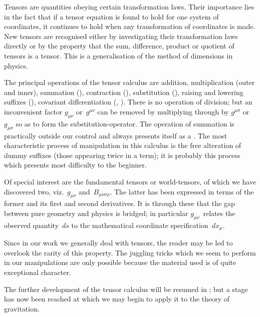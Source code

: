\documentclass[12pt]{book}
\begin{document}

Tensors are quantities obeying certain transformation laws. Their importance
lies in the fact that if a tensor equation is found to hold for one
system of coordinates, it continues to hold when any transformation of
coordinates is made. New tensors are recognised either by investigating
their transformation laws directly or by the property that the sum, difference,
product or quotient of tensors is a tensor. This is a generalisation of the
method of dimensions in physics.

The principal operations of the tensor calculus are addition, multiplication
(outer and inner), summation (), contraction (), substitution (),
raising and lowering suffixes (), covariant differentiation (, ). There
is no operation of division; but an inconvenient factor $g_{\mu\nu}$ or~$g^{\mu\nu}$ can be
removed by multiplying through by $g^{\mu\sigma}$ or~$g_{\mu\sigma}$ so as to form the substitution-operator.
The operation of summation is practically outside our control and
always presents itself as a . The most characteristic process of
manipulation in this calculus is the free alteration of dummy suffixes (those
appearing twice in a term); it is probably this process which presents most
difficulty to the beginner.

Of special interest are the fundamental tensors or world-tensors, of which we
have discovered two, viz.\ $g_{\mu\nu}$ and~$B_{\mu\nu\sigma\rho}$. The latter has been expressed in terms
of the former and its first and second derivatives. It is through these that the
gap between pure geometry and physics is bridged; in particular $g_{\mu\nu}$~relates
the observed quantity~$ds$ to the mathematical coordinate specification~$dx_{\mu}$.

Since in our work we generally deal with tensors, the reader may be led
to overlook the rarity of this property. The juggling tricks which we seem
to perform in our manipulations are only possible because the material used
is of quite exceptional character.

The further development of the tensor calculus will be resumed in ;
but a stage has now been reached at which we may begin to apply it to the
theory of gravitation.


%
\end{document}
